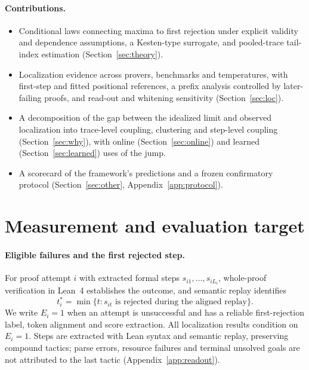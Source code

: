 \documentclass{article}
\newcommand{\1}{\mathbf{1}}
\begin{document}
\paragraph{Contributions.}
\begin{itemize}
\item Conditional laws connecting maxima to first rejection under explicit validity and dependence assumptions, a Kesten-type surrogate, and pooled-trace tail-index estimation (Section~\ref{sec:theory}).
\item Localization evidence across provers, benchmarks and temperatures, with first-step and fitted positional references, a prefix analysis controlled by later-failing proofs, and read-out and whitening sensitivity (Section~\ref{sec:loc}).
\item A decomposition of the gap between the idealized limit and observed localization into trace-level coupling, clustering and step-level coupling (Section~\ref{sec:why}), with online (Section~\ref{sec:online}) and learned (Section~\ref{sec:learned}) uses of the jump.
\item A scorecard of the framework's predictions and a frozen confirmatory protocol (Section~\ref{sec:other}, Appendix~\ref{app:protocol}).
\end{itemize}

\section{Measurement and evaluation target}\label{sec:measure}

\paragraph{Eligible failures and the first rejected step.} For proof attempt $i$ with extracted formal steps $s_{i1},\dots,s_{iL_i}$, whole-proof verification in Lean~4 \citep{demoura2021} establishes the outcome, and semantic replay identifies
\begin{equation}\label{eq:tstar}
t_i^* = \min\{t : s_{it}\text{ is rejected during the aligned replay}\}.
\end{equation}
We write $E_i=1$ when an attempt is unsuccessful and has a reliable first-rejection label, token alignment and score extraction. All localization results condition on $E_i=1$. Steps are extracted with Lean syntax and semantic replay, preserving compound tactics; parse errors, resource failures and terminal unsolved goals are not attributed to the last tactic (Appendix~\ref{app:readout}).
\end{document}
